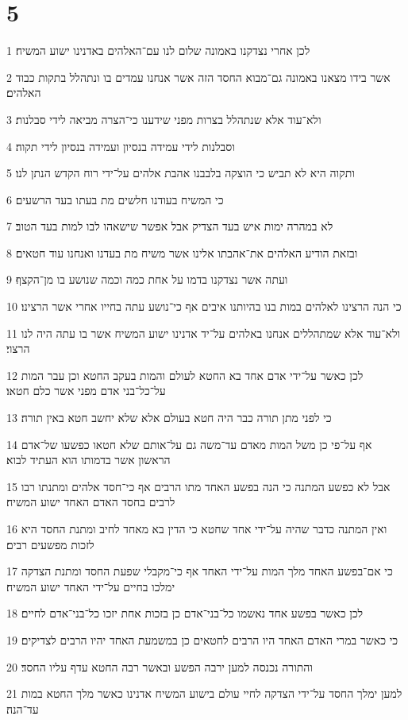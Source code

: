 \chapter{5}

\par 1 לכן אחרי נצדקנו באמונה שלום לנו עם־האלהים באדנינו ישוע המשיח׃
\par 2 אשר בידו מצאנו באמונה גם־מבוא החסד הזה אשר אנחנו עמדים בו ונתהלל בתקות כבוד האלהים׃
\par 3 ולא־עוד אלא שנתהלל בצרות מפני שידענו כי־הצרה מביאה לידי סבלנות׃
\par 4 וסבלנות לידי עמידה בנסיון ועמידה בנסיון לידי תקוה׃
\par 5 ותקוה היא לא תביש כי הוצקה בלבבנו אהבת אלהים על־ידי רוח הקדש הנתן לנו׃
\par 6 כי המשיח בעודנו חלשים מת בעתו בעד הרשעים׃
\par 7 לא במהרה ימות איש בעד הצדיק אבל אפשר שישאהו לבו למות בעד הטוב׃
\par 8 ובזאת הודיע האלהים את־אהבתו אלינו אשר משיח מת בעדנו ואנחנו עוד חטאים׃
\par 9 ועתה אשר נצדקנו בדמו על אחת כמה וכמה שנושע בו מן־הקצף׃
\par 10 כי הנה הרצינו לאלהים במות בנו בהיותנו איבים אף כי־נושע עתה בחייו אחרי אשר הרצינו׃
\par 11 ולא־עוד אלא שמתהללים אנחנו באלהים על־יד אדנינו ישוע המשיח אשר בו עתה היה לנו הרצוי׃
\par 12 לכן כאשר על־ידי אדם אחד בא החטא לעולם והמות בעקב החטא וכן עבר המות על־כל־בני אדם מפני אשר כלם חטאו׃
\par 13 כי לפני מתן תורה כבר היה חטא בעולם אלא שלא יחשב חטא באין תורה׃
\par 14 אף על־פי כן משל המות מאדם עד־משה גם על־אותם שלא חטאו כפשעו של־אדם הראשון אשר בדמותו הוא העתיד לבוא׃
\par 15 אבל לא כפשע המתנה כי הנה בפשע האחד מתו הרבים אף כי־חסד אלהים ומתנתו רבו לרבים בחסד האדם האחד ישוע המשיח׃
\par 16 ואין המתנה כדבר שהיה על־ידי אחד שחטא כי הדין בא מאחד לחיב ומתנת החסד היא לזכות מפשעים רבים׃
\par 17 כי אם־בפשע האחד מלך המות על־ידי האחד אף כי־מקבלי שפעת החסד ומתנת הצדקה ימלכו בחיים על־ידי האחד ישוע המשיח׃
\par 18 לכן כאשר בפשע אחד נאשמו כל־בני־אדם כן בזכות אחת יזכו כל־בני־אדם לחיים׃
\par 19 כי כאשר במרי האדם האחד היו הרבים לחטאים כן במשמעת האחד יהיו הרבים לצדיקים׃
\par 20 והתורה נכנסה למען ירבה הפשע ובאשר רבה החטא עדף עליו החסד׃
\par 21 למען ימלך החסד על־ידי הצדקה לחיי עולם בישוע המשיח אדנינו כאשר מלך החטא במות עד־הנה׃


